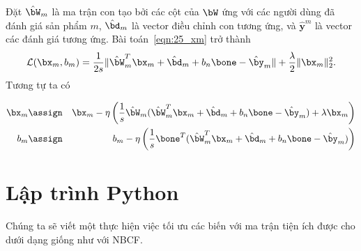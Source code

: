 Đặt $\hat{\bW}_m$ là ma trận con tạo bởi các cột của $\bW$ ứng
với các người dùng đã đánh giá sản phẩm $m$, $\hat{\bd}_m$ là vector điều chỉnh con
tương ứng, và $\hat{\mathbf{y}}^m$ là vector các đánh giá tương ứng. Bài
toán~\eqref{eqn:25_xm} trở thành
\begin{equation} 
\mathcal{L}(\bx_m, b_m) 
 = \frac{1}{2s}\|\hat{\bW}_m^T\bx_m + \hat{\bd}_m + b_n\bone - \hat{\by}_m \| +
 \frac{\lambda}{2}\|\bx_m\|_2^2.
\end{equation} 
Tương tự ta có  

\begin{eqnarray}
    \bx_m &\assign & \bx_m -
    \eta\left(\frac{1}{s}\hat{\bW}_m(\hat{\bW}_m^T\bx_m + \hat{\bd}_m +
    b_n\bone - \hat{\by}_m) + \lambda\bx_m\right) \\
    b_m &\assign& b_m - \eta\left(\frac{1}{s}\bone^T(\hat{\bW}_m^T\bx_m + \hat{\bd}_m +
    b_n\bone - \hat{\by}_m)\right)
\end{eqnarray} 

\section{Lập trình Python }
Chúng ta sẽ viết một  thực hiện việc tối ưu
các biến với ma trận tiện ích được cho dưới dạng  giống
như với NBCF. 

